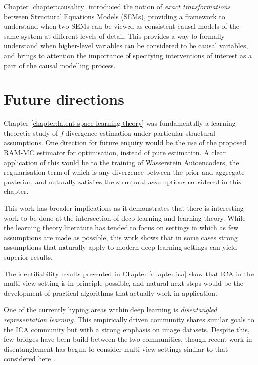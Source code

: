 Chapter \ref{chapter:causality} introduced the notion of \emph{exact transformations} between Structural Equations Models (SEMs), providing a framework to understand when two SEMs can be viewed as consistent causal models of the same system at different levels of detail. 
This provides a way to formally understand when higher-level variables can be considered to be causal variables, and brings to attention the importance of specifying interventions of interest as a part of the causal modelling process.


\section{Future directions}

Chapter \ref{chapter:latent-space-learning-theory} was fundamentally a learning theoretic study of $f$-divergence estimation under particular structural assumptions. 
One direction for future enquiry would be the use of the proposed RAM-MC estimator for optimisation, instead of pure estimation. 
A clear application of this would be to the training of Wasserstein Autoencoders, the regularisation term of which is any divergence between the prior and aggregate posterior, and naturally satisfies the structural assumptions considered in this chapter.

This work has broader implications as it demonstrates that there is interesting work to be done at the intersection of deep learning and learning theory. 
While the learning theory literature has tended to focus on settings in which as few assumptions are made as possible, this work shows that in some cases strong assumptions that naturally apply to modern deep learning settings can yield superior results.

The identifiability results presented in Chapter \ref{chapter:ica} show that ICA in the multi-view setting is in principle possible, and natural next steps would be the development of practical algorithms that actually work in application.

One of the currently hyping areas within deep learning is \emph{disentangled representation learning}. 
This empirically driven community shares similar goals to the ICA community but with a strong emphasis on image datasets.
Despite this, few bridges have been build between the two communities, though recent work in  disentanglement has begun to consider multi-view settings similar to that considered here \citep{shu2019weakly}.

